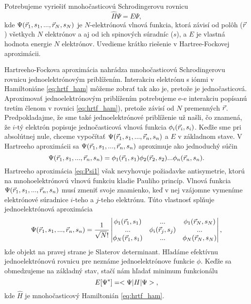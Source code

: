 Potrebujeme vyriešiť mnohočasticovú Schrodingerovu rovnicu 
\begin{equation}
\label{eq:mohocasticovaschr}
\hat{H} \Psi = E \Psi, 
\end{equation}
kde $\Psi(\vec{r}_1,s_1,...,\vec{r}_N,s_N)$ je $N$-elektrónová vlnová funkcia, ktorá závisí od polôh ($\vec{r}$) všetkych $N$ elektrónov
a aj od ich spinových súradníc ($s$), a $E$ je vlastná hodnota energie $N$ elektrónov. Uvedieme krátko riešenie v Hartree-Fockovej aproximácii.




Hartreeho-Fockova aproximácia nahrádza mnohočasticovú Schrodingerovu rovnicu jednoelektrónovým priblížením.
Interakciu elektrónu s iónmi v Hamiltoniáne \eqref{eq:hrtf_ham} môžeme zobrať tak ako je, pretože je jednočasticová.
Aproximovať jednoelektrónovým priblížením potrebujeme e-e interakciu popísanú tretím členom v rovnici \ref{eq:hrtf_ham}), pretože závisí od $N$ premenných $\vec{r}$.
Predpokladajme, že sme také jednoelektrónové priblíženie už našli, čo znamená, že $i$-tý elektrón popisuje jednočasticová vlnová funkcia
$\phi_i(\vec{r}_i,s_i)$. Keďže sme pri absolútnej nule, chceme vypočítať $\Psi(\vec{r}_1,s_1,...,\vec{r}_n,s_n)$ a $E$  v základnom stave. 
V Hartreeho aproximácii sa $\Psi(\vec{r}_1,s_1,...,\vec{r}_n,s_n)$ aproximuje ako jednoduchý súčin
\begin{equation}
\label{eq:Psi1}
\Psi(\vec{r}_1,s_1,...,\vec{r}_n,s_n)=\phi_1(\vec{r}_1,s_1)\phi_2(\vec{r}_2,s_2)...\phi_n(\vec{r}_n,s_n) \text{.}
\end{equation}
Hartreeho aproximácia \eqref{eq:Psi1} však nevyhovuje požiadavke antisymetrie, ktorú na mnohoelektrónovú vlnovú funkciu kladie Pauliho princíp.
Vlnová funkcia $\Psi(\vec{r}_1,s_1,...,\vec{r}_n,s_n)$ musí zmeniť svoje znamienko,
keď v nej vzájomne vymeníme elektrónové súradnice $i$-teho a $j$-teho elektrónu. Túto vlastnosť splňuje jednoelektrónová aproximácia
\begin{equation}
\label{eq:slatter}
\Psi(\vec{r}_1,s_1,...,\vec{r}_n,s_n)=\frac{1}{\sqrt N!}
\begin{vmatrix}
\phi_1(\vec{r}_1,s_1)& ... & \phi_1(\vec{r}_N,s_N) \\
...& \phi_i(\vec{r}_j,s_j)& ... \\
\phi_N(\vec{r}_1,s_1)& ... & \phi_N(\vec{r}_N,s_N)
\end{vmatrix}
\text{,}
\end{equation}
kde objekt na pravej strane je Slaterov determinant. Hľadáme efektívnu jednoelektrónovú rovnicu pre neznáme jednoelektrónove funkcie $\phi$.
Keďže sa obmedzujeme na základný stav,
stačí nám hľadať minimum funkcionálu
\begin{equation}
\label{eq:erg_func}
E[\Psi^*]=<\Psi|H|\Psi>\text{,}
\end{equation}
kde $\hat{H}$ je mnohočasticový Hamiltonián \eqref{eq:hrtf_ham}.

